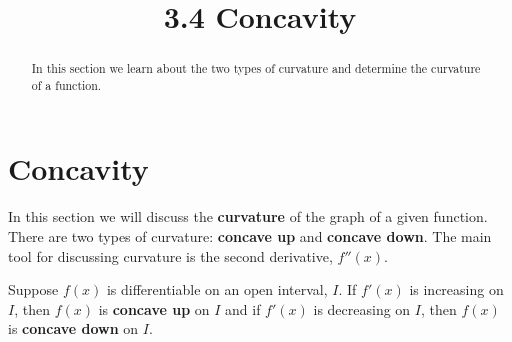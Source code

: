\documentclass{ximera}
\title{3.4 Concavity}
\begin{document}
\begin{abstract}
In this section we learn about the two types of curvature and determine the curvature of a function.
\end{abstract}

\maketitle

\section{Concavity}

In this section we will discuss the {\bf curvature} of the graph of a given function. 
There are two types of curvature: {\bf concave up} and {\bf concave down}.  
The main tool for discussing curvature is the second derivative, $f''(x)$.





\begin{definition}[Concavity]
Suppose $f(x)$ is differentiable on an open interval, $I$.
If $f'(x)$ is increasing on $I$, then $f(x)$ is \textbf{concave up} on $I$ and
if $f'(x)$ is decreasing on $I$, then $f(x)$ is \textbf{concave down} on $I$.
\end{definition} 


\begin{image}
\end{image}


\end{document}
